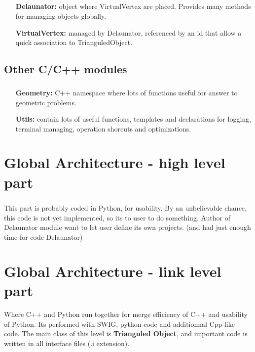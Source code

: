 \documentclass{report}
\begin{document}
    \paragraph*{}
    \begin{itemize}
        \item[\textbf{Delaunator:}] object where VirtualVertex are placed. Provides many methods for managing objects globally.
        \item[\textbf{VirtualVertex:}] managed by Delaunator, referenced by an id that allow a quick association to TrianguledObject.
    \end{itemize}



\section{Other C/C++ modules}
    \paragraph*{}
    \begin{itemize}
        \item[\textbf{Geometry:}] C++ namespace where lots of functions useful for answer to geometric problems.
        \item[\textbf{Utils:}] contain lots of useful functions, templates and declarations for logging, terminal managing, operation shorcuts and optimizations.
    \end{itemize}




\chapter{Global Architecture - high level part}
    \paragraph*{}
    This part is probably coded in Python, for usability. By an unbelievable chance, this code is not yet implemented, so its to user to do something.
    Author of Delaunator module want to let user define its own projects. (and had just enough time for code Delaunator)




\chapter{Global Architecture - link level part}
Where C++ and Python run together for merge efficiency of C++ and usability of Python.
Its performed with SWIG, python code and additionnal Cpp-like code. 
The main class of this level is \textbf{Trianguled Object}, and important code is written in all interface files (.i extension).
\end{document}
